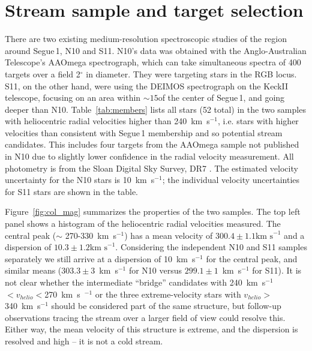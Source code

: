 \documentclass{emulateapj}
\begin{document}
\section{Stream sample and target selection}
\label{sec:medres}


There are two existing medium-resolution spectroscopic studies of the region around Segue\,1, N10 and S11. N10's data was obtained with the Anglo-Australian Telescope's AAOmega spectrograph, which can take simultaneous spectra of 400 targets over a field 2$^{\circ}$ in diameter. They were targeting stars in the RGB locus. S11, on the other hand, were using the {\small DEIMOS} spectrograph on the KeckII telescope, focusing on an area within $\sim 15$\arcmin of the center of Segue\,1, and going deeper than N10. Table~\ref{tab:members} lists all stars (52 total) in the two samples with heliocentric radial velocities higher than 240~km~s$^{-1}$, i.e. stars with higher velocities than consistent with Segue\,1 membership and so potential stream candidates. This includes four targets from the AAOmega sample not published in N10 due to slightly lower confidence in the radial velocity measurement. All photometry is from the Sloan Digital Sky Survey, DR7 \citep{Abazajian2009}. The estimated velocity uncertainty for the N10 stars is 10~km~s$^{-1}$; the individual velocity uncertainties for S11 stars are shown in the table.

Figure~\ref{fig:col_mag} summarizes the properties of the two samples. The top left panel shows a histogram of the heliocentric radial velocities measured. The central peak ($\sim$ 270-330~km~s$^{-1}$) has a mean velocity of $300.4 \pm 1.1 \mbox{km s}^{-1}$ and a dispersion of $10.3 \pm 1.2 \mbox{km s}^{-1}$. Considering the independent N10 and S11 samples separately we still arrive at a dispersion of 10~km~s$^{-1}$ for the central peak, and similar means ($303.3 \pm 3$~km~s$^{-1}$ for N10 versus $299.1 \pm 1$~km~s$^{-1}$ for S11). It is not clear whether the intermediate ``bridge'' candidates with 240~km~s$^{-1}$ $< v_{helio} < $270~km~s~$^{-1}$ or the three extreme-velocity stars with $v_{helio} > $ 340~km~s$^{-1}$ should be considered part of the same structure, but follow-up observations tracing the stream over a larger field of view could resolve this. Either way, the mean velocity of this structure is extreme, and the dispersion is resolved and high -- it is not a cold stream.
\end{document}
